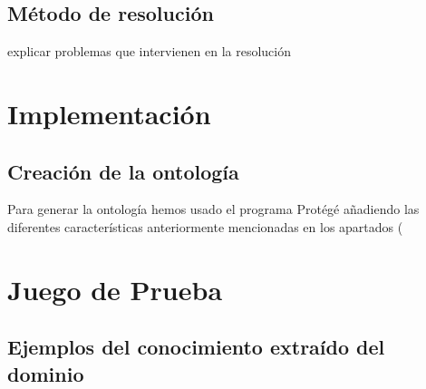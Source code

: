 \documentclass[12]{article}
\begin{document}

\subsection{Método de resolución}

 explicar problemas que intervienen en la resolución

\section{Implementación}

\subsection{Creación de la ontología}

Para generar la ontología hemos usado el programa Protégé añadiendo las diferentes características anteriormente mencionadas en los apartados (


\section{Juego de Prueba}



\subsection{Ejemplos del conocimiento extraído del dominio}
\end{document}
